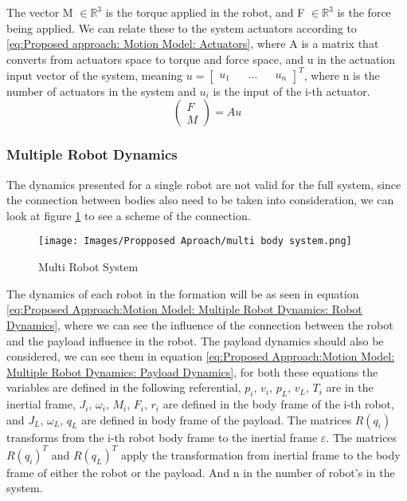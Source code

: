 The vector M $\in \mathbb{R}^{3}$ is the torque applied in the robot, and F $\in \mathbb{R}^3$ is the force being applied. We can relate these to the system actuators according to \ref{eq:Proposed approach: Motion Model: Actuators}, where A is a matrix that converts from actuators space to torque and force space, and u in the actuation input vector of the system, meaning $u = \begin{bmatrix} u_{1} && \dots && u_{n} \end{bmatrix}^{T}$, where n is the number of actuators in the system and $u_{i}$ is the input of the i-th actuator. 
\begin{equation}
    \begin{pmatrix}
        F \\
        M
    \end{pmatrix} = A u
    \label{eq:Proposed approach: Motion Model: Actuators}
\end{equation}

\subsubsection{Multiple Robot Dynamics}

The dynamics presented for a single robot are not valid for the full system, since the connection between bodies also need to be taken into consideration, we can look at figure \ref{fig:Proposed Approach: Motion Model: Multi Robot System} to see a scheme of the connection.

\begin{figure}[H]
    \centering
    \texttt{[image: Images/Propposed Aproach/multi body system.png]}
    \caption{Multi Robot System}
    \label{fig:Proposed Approach: Motion Model: Multi Robot System}
\end{figure}

The dynamics of each robot in the formation will be as seen in equation \ref{eq:Proposed Approach:Motion Model: Multiple Robot Dynamics: Robot Dynamics}, where we can see the influence of the connection between the robot and the payload influence in the robot. The payload dynamics should also be considered,  we can see them in equation \ref{eq:Proposed Approach:Motion Model: Multiple Robot Dynamics: Payload Dynamics}, for both these equations the variables are defined in the following referential, $p_{i}$, $v_{i}$, $p_ {L}$, $v_{L}$, $T_{i}$ are in the inertial frame, $J_{i}$, $\omega_{i}$, $M_i$, $F_i$, $r_i$ are defined in the body frame of the i-th robot, and $J_{L}$, $\omega_{L}$, $q_L$ are defined in body frame of the payload. The matrices $R(q_{i})$ transforms from the i-th robot body frame to the inertial frame $\varepsilon$. The matrices $R(q_{i})^T$ and $R(q_{L})^T$ apply the transformation from inertial frame to the body frame of either the robot or the payload. And n in the number of robot's in the system.



